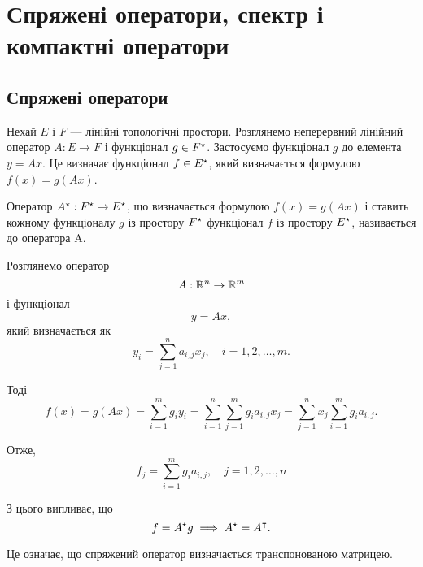 \chapter{Спряжені оператори, спектр і компактні оператори}

\section{Спряжені оператори}

Нехай $E$ і $F$ --- лінійні топологічні простори.
Розглянемо неперервний лінійний оператор $A: E \to F$ і
функціонал $g \in F^\star$.
Застосуємо функціонал $g$ до елемента
$y = Ax$. Це визначає функціонал
$f \in E^\star$, який
визначається формулою $f(x) = g(Ax)$.

\begin{definition}
Оператор $A^\star: F^\star \to E^\star$, що визначається
формулою $f(x) = g(Ax)$ і ставить кожному
функціоналу $g$ із простору $F^\star$
функціонал $f$ із простору $E^\star$,
називається  до оператора A.
\end{definition}

\begin{example}
Розглянемо оператор
\begin{equation*}
    A: \mathbb{R}^n \to \mathbb{R}^m
\end{equation*}
і функціонал
\begin{equation*}
    y = Ax,
\end{equation*}
який визначається як
\begin{equation*}
    y_i = \sum_{j = 1}^n a_{i,j} x_j, \quad i = 1, 2, \dots, m.
\end{equation*}

Тоді
\begin{equation*}
    f(x) = g(A x) = \sum_{i = 1}^m g_i y_i =
    \sum_{i = 1}^n \sum_{j = 1}^m g_i a_{i,j} x_j =
    \sum_{j = 1}^n x_j \sum_{i = 1}^m g_i a_{i,j}.
\end{equation*}

Отже,
\begin{equation*}
    f_j = \sum_{i = 1}^m g_i a_{i,j}, \quad j = 1, 2, \dots, n
\end{equation*}

З цього випливає, що
\begin{equation*}
    f = A^\star g \implies A^\star = A^\intercal.
\end{equation*}

Це означає, що спряжений оператор визначається
транспонованою матрицею. 
\end{example}

